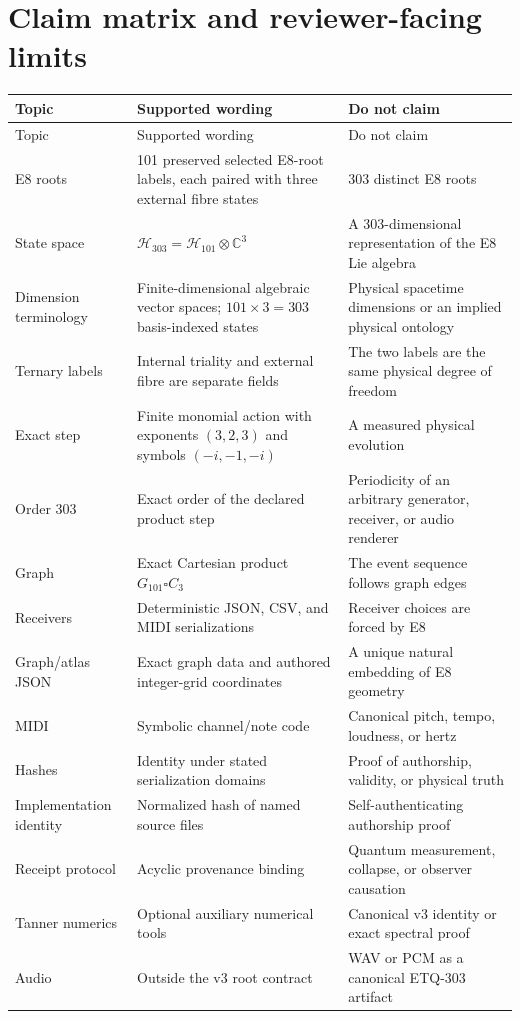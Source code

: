 \documentclass[11pt,a4paper]{article}
\theoremstyle{definition}
\newcommand{\Hone}{\mathcal H_{101}}
\newcommand{\Hthree}{\mathcal H_{303}}
\newcommand{\Gone}{G_{101}}
\begin{document}
\section{Claim matrix and reviewer-facing limits}
\begin{longtable}{@{}p{31mm}p{58mm}p{59mm}@{}}
\toprule
Topic & Supported wording & Do not claim \\
\midrule
\endfirsthead
\toprule
Topic & Supported wording & Do not claim \\
\midrule
\endhead
E8 roots & 101 preserved selected E8-root labels, each paired with three external fibre states & 303 distinct E8 roots \\
State space & $\Hthree=\Hone\otimes\mathbb C^3$ & A 303-dimensional representation of the E8 Lie algebra \\
Dimension terminology & Finite-dimensional algebraic vector spaces; $101\times3=303$ basis-indexed states & Physical spacetime dimensions or an implied physical ontology \\
Ternary labels & Internal triality and external fibre are separate fields & The two labels are the same physical degree of freedom \\
Exact step & Finite monomial action with exponents $(3,2,3)$ and symbols $(-i,-1,-i)$ & A measured physical evolution \\
Order 303 & Exact order of the declared product step & Periodicity of an arbitrary generator, receiver, or audio renderer \\
Graph & Exact Cartesian product $\Gone\square C_3$ & The event sequence follows graph edges \\
Receivers & Deterministic JSON, CSV, and MIDI serializations & Receiver choices are forced by E8 \\
Graph/atlas JSON & Exact graph data and authored integer-grid coordinates & A unique natural embedding of E8 geometry \\
MIDI & Symbolic channel/note code & Canonical pitch, tempo, loudness, or hertz \\
Hashes & Identity under stated serialization domains & Proof of authorship, validity, or physical truth \\
Implementation identity & Normalized hash of named source files & Self-authenticating authorship proof \\
Receipt protocol & Acyclic provenance binding & Quantum measurement, collapse, or observer causation \\
Tanner numerics & Optional auxiliary numerical tools & Canonical v3 identity or exact spectral proof \\
Audio & Outside the v3 root contract & WAV or PCM as a canonical ETQ-303 artifact \\
\bottomrule
\end{longtable}
\end{document}
